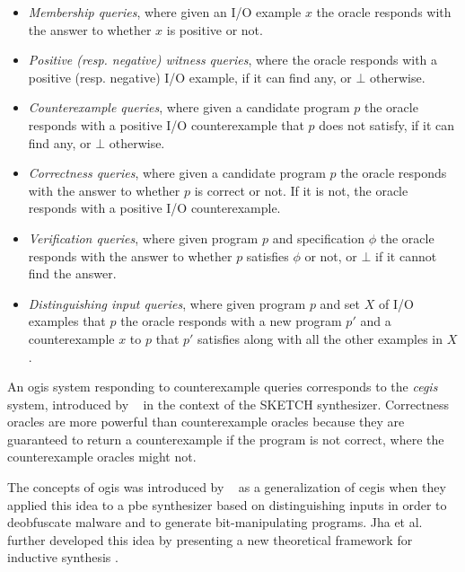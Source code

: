 \begin{itemize}
\item \textit{Membership queries}, where given an I/O example $x$ the oracle
  responds with the answer to whether $x$ is positive or not.
\item \textit{Positive (resp. negative) witness queries}, where the oracle
  responds with a positive (resp. negative) I/O example, if it can find any, or
  $\bot$ otherwise.
\item \textit{Counterexample queries}, where given a candidate program $p$ the
  oracle responds with a positive I/O counterexample that $p$ does not satisfy,
  if it can find any, or $\bot$ otherwise.
\item \textit{Correctness queries}, where given a candidate program $p$ the
  oracle responds with the answer to whether $p$ is correct or not. If it is not,
  the oracle responds with a positive I/O counterexample.
\item \textit{Verification queries}, where given program $p$ and specification
  $\phi$ the oracle responds with the answer to whether $p$ satisfies $\phi$ or
  not, or $\bot$ if it cannot find the answer.
\item \textit{Distinguishing input queries}, where given program $p$ and set $X$
  of I/O examples that $p$  the oracle responds with a new program $p'$ and a
  counterexample $x$ to $p$ that $p'$ satisfies along with all the other
  examples in $X$.
\end{itemize}

An \gls{ogis} system responding to counterexample queries corresponds to the
\textit{\gls{cegis}} system, introduced by
\citeauthor{Solar-Lezama:2008}~\cite{Solar-Lezama:2008} in the context of the
SKETCH synthesizer. Correctness oracles are more powerful than counterexample
oracles because they are guaranteed to return a counterexample if the program is
not correct, where the counterexample oracles might not.

The concepts of \gls{ogis} was introduced by
\citeauthor{Jha:2017:TFS}~\cite{Jha:2017:TFS} as a generalization of \gls{cegis}
when they applied this idea to a \gls{pbe} synthesizer based on distinguishing
inputs in order to deobfuscate malware and to generate bit-manipulating
programs. Jha et al. further developed this idea by presenting a new theoretical
framework for inductive synthesis \cite{Jha:2017:TFS}.

